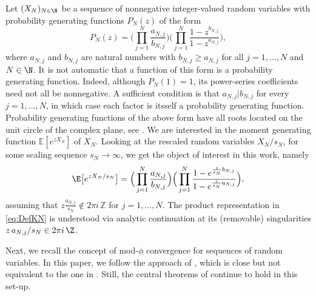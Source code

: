 \documentclass[11pt,a4paper]{scrartcl}
\numberwithin{equation}{section}
\theoremstyle{plain}
\theoremstyle{definition}
\theoremstyle{remark}
\begin{document}
Let $(X_N)_{N\in\N}$ be a sequence of nonnegative integer-valued random variables with probability generating functions $P_N(z)$ of the form
$$
P_N(z) = \Big(\prod_{j=1}^N\frac{a_{N,j}}{b_{N,j}}\Big) \Big(\prod_{j=1}^N \frac{1-z^{b_{N,j}}}{1-z^{a_{N,j}}}\Big),
$$
where $a_{N,j}$ and $b_{N,j}$ are natural numbers with $b_{N,j} \ge a_{N,j}$ for all $j=1, \dots, N$ and  $N\in\N$. It is not automatic that a function of this form is a probability generating function. Indeed, although $P_N(1)=1$, its power-series coefficients need not all be nonnegative. A sufficient condition is that $a_{N,j}|b_{N,j}$ for every $j=1,\ldots,N$, in which case each factor is itsself a probability generating function. Probability generating functions of the above form have all roots located on the unit circle of the complex plane, see \cite{BilleySwanson,heerten2024probabilistic,hwang2015limit}. We are interested in the moment generating function $\mathbb{E}[e^{z X_N}]$ of $X_N$. Looking at the rescaled random variables ${X_N}/{s_N}$, for some scaling sequence $s_N\to\infty$, we get the object of interest in this work, namely
\begin{align}\label{eq:DefKN}
\E\big[e^{z X_N/s_N} \big] = \Big(\prod_{j=1}^N \frac{a_{N,j}}{b_{N,j}} \Big)\Big(\prod_{j=1}^N \frac{1-e^{\frac{z}{s_N} b_{N,j}}}{1-e^{\frac{z}{s_N} a_{N,j}}}\Big),
\end{align}
assuming that $z \frac{a_{N,j}}{s_N} \notin 2\pi i\,\mathbb{Z}$ for $j=1,\ldots,N$. The product representation in \eqref{eq:DefKN} is understood via analytic continuation at its (removable) singularities $z\,a_{N,j}/s_N\in 2\pi i\,\Z$.

Next, we recall the concept of mod-$\phi$ convergence for sequences of random variables. In this paper, we follow the approach of  \cite{kabluchko2024mod}, which is close but not equivalent to the one in \cite{feray2018mod}. Still, the central theorems of \cite{feray2018mod} continue to hold in this set-up. 
\end{document}
